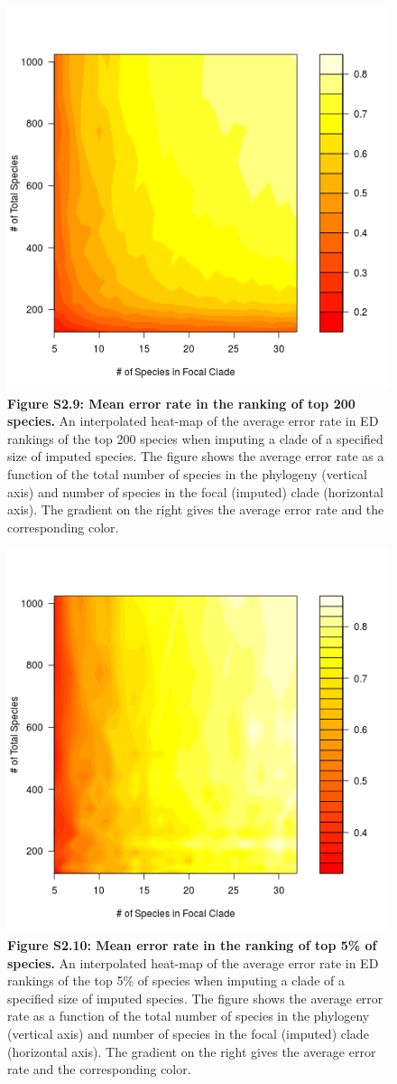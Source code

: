 \documentclass[10pt,english]{article}
\begin{document}
\begin{figure}[!ht]
  \center
  \includegraphics[width=.5\textwidth]{../figures/errorRate200.png}
  \caption*{\textbf{Figure S2.9: Mean error rate in the ranking of top 200
  species.} An interpolated heat-map of the average error rate in ED rankings of
  the top 200 species when imputing a clade of a specified size of imputed
  species. The figure shows the average error rate as a function of the total
  number of species in the phylogeny (vertical axis) and number of species in
  the focal (imputed) clade (horizontal axis). The gradient on
  the right gives the average error rate and the corresponding color.}
\end{figure}

\begin{figure}[!ht]
  \center
  \includegraphics[width=.5\textwidth]{../figures/errorRate5pct.png}
  \caption*{\textbf{Figure S2.10: Mean error rate in the ranking of top 5\% of
  species.} An interpolated heat-map of the average error rate in ED rankings of
  the top 5\% of species when imputing a clade of a specified size of imputed
  species. The figure shows the average error rate as a function of the total
  number of species in the phylogeny (vertical axis) and number of species in
  the focal (imputed) clade (horizontal axis). The gradient on the right gives
  the average error rate and the corresponding color.}
\end{figure}
\end{document}
